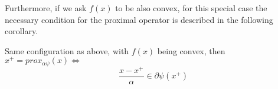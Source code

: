 Furthermore, if we ask $f(x)$ to be also convex, for this special case the necessary condition for the proximal operator is described in the following corollary.
\begin{corollary}
    Same configuration as above, with $f(x)$ being convex, then $x^+ = prox_{\alpha\psi}(x) \iff $ 
    \begin{equation*}
        \frac{x - x^+}{\alpha} \in \partial \psi(x^+) 
    \end{equation*}

\end{corollary}